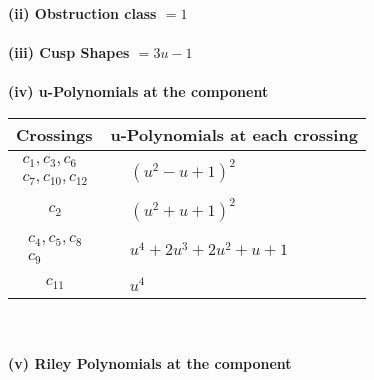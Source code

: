 \documentclass[1p]{elsarticle_modified}
\theoremstyle{definition}
\begin{document}
\flushleft \textbf{(ii) Obstruction class $= 1$}\\~\\
\flushleft \textbf{(iii) Cusp Shapes $= 3 u-1$}\\~\\
\newpage\renewcommand{\arraystretch}{1}
\flushleft \textbf{(iv) u-Polynomials at the component}\newline \\
\begin{tabular}{m{50pt}|m{274pt}}
Crossings & \hspace{64pt}u-Polynomials at each crossing \\
\hline $$\begin{aligned}c_{1},c_{3},c_{6}\\c_{7},c_{10},c_{12}\end{aligned}$$&$\begin{aligned}
&(u^2- u+1)^2
\end{aligned}$\\
\hline $$\begin{aligned}c_{2}\end{aligned}$$&$\begin{aligned}
&(u^2+u+1)^2
\end{aligned}$\\
\hline $$\begin{aligned}c_{4},c_{5},c_{8}\\c_{9}\end{aligned}$$&$\begin{aligned}
&u^4+2 u^3+2 u^2+u+1
\end{aligned}$\\
\hline $$\begin{aligned}c_{11}\end{aligned}$$&$\begin{aligned}
&u^4
\end{aligned}$\\
\hline
\end{tabular}\\~\\
\newpage\renewcommand{\arraystretch}{1}
\flushleft \textbf{(v) Riley Polynomials at the component}\newline \\
\end{document}
